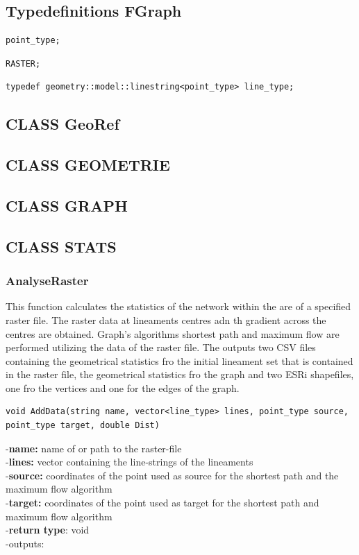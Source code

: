 \documentclass[10pt,a4paper]{article}
\begin{document}
\subsection{Typedefinitions FGraph}

\begin{verbatim}
point_type;
\end{verbatim}

\begin{verbatim}
RASTER;
\end{verbatim}

\begin{verbatim}
typedef geometry::model::linestring<point_type> line_type;
\end{verbatim}





\subsection{CLASS GeoRef}

\subsection{CLASS GEOMETRIE}

\subsection{CLASS GRAPH}

\subsection{CLASS STATS}
\subsubsection{AnalyseRaster}
This function calculates the statistics of the network within the are of a specified raster file.
The raster data at lineaments centres adn th gradient across the centres are obtained.
Graph's algorithms shortest path and maximum flow are performed utilizing the data of the raster file.
The outputs two CSV files containing the geometrical statistics fro the initial lineament set that is contained in the raster file, the geometrical statistics fro the graph and two ESRi shapefiles, one fro the vertices and one for the edges of the graph. 
\begin{verbatim}
void AddData(string name, vector<line_type> lines, point_type source, 
point_type target, double Dist)
\end{verbatim}
-\textbf{name:} name of or path to the raster-file \\
-\textbf{lines:} vector containing the line-strings of the lineaments \\
-\textbf{source:} coordinates of the point used as source for the shortest path and the maximum flow algorithm \\
-\textbf{target:} coordinates of the point used as target for the shortest path and maximum flow algorithm \\
-\textbf{return type}: void \\
-outputs: 
\end{document}
